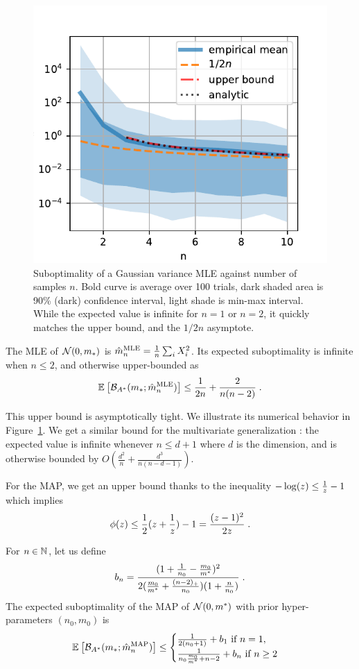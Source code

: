 \documentclass[twoside]{article}
\newcommand*{\expect}[2][]{\ensuremath{\mathbb{E}_{#1} \left[ #2 \right] }} %
\newcommand{\logpart}{A}
\newcommand{\bregmanconj}{\cB_{\logpart^*}}
\newcommand{\m}{m}
\begin{document}
\begin{figure}[ht]
	\centering
\includegraphics[width=.4\textwidth]{fewsamples.pdf}
	\caption{Suboptimality of a Gaussian variance MLE against number of samples $n$. Bold curve is average over 100 trials,  dark shaded area is 90\% (dark) confidence interval, light shade is min-max interval. 
		While the expected value is infinite for $n=1$ or $n=2$, it quickly matches the upper bound, and the $1/2n$ asymptote.
	}
	\label{fig:curves}
\end{figure}


\begin{theorem}
	The MLE of $\cN(0,\m_*)$ is $\hat \m_n^\text{MLE} = \inv{n} \sum_i X_i^2 $.
	Its expected suboptimality is infinite when $n\leq 2$, and otherwise upper-bounded as
	\begin{align}
		 \expect{\bregmanconj( \m_*; \hat \m_n^\text{MLE}) }
			\leq \inv{2n} +\frac{2}{n(n-2)} \; .
			\label{eq:MLE_rate}
	\end{align}
\end{theorem}

This upper bound is asymptotically tight.
We illustrate its numerical behavior in Figure~\ref{fig:curves}.
We get a similar bound for the multivariate generalization :
the expected value is infinite whenever $n \leq d+1$ where $d$ is the dimension, and is otherwise bounded by $O(\frac{d^2}{n} + \frac{d^3}{n(n-d-1)} )$.
  
For the MAP, we get an upper bound thanks to the inequality $ - \log(z) \leq \frac{1}{z} - 1$ which implies
\begin{align}
	\label{eq:log_bound} 
	\phi(z) \leq \frac{1}{2} (z + \frac{1}{z}) - 1 = \frac{(z-1)^2}{2 z} \; .
\end{align}

\begin{theorem}
 For $n\in \mathbb{N}$, let us  define
 \begin{align}
	b_n = \frac{(1 + \inv{n_0} - \frac{\m_0}{\m^*})^2}{2 (\frac{\m_0}{\m^*}+\frac{(n-2)_+}{n_0})(1 + \frac{n}{n_0} )} \; .
 \end{align}
The expected suboptimality of the MAP of $\cN(0,\m^*)$ with prior hyper-parameters $(n_0,\m_0)$ is
 \begin{equation}
	\expect{\bregmanconj( \m_*; \hat \m_n^\text{MAP})}
	\leq \begin{cases}
		\inv{2(n_0+1)}  +  b_1 \ \text{if}\ n=1,\\
		\frac{1}{n_0 \frac{\m_0}{\m^*} +n-2} + b_n \ \text{if}\ n\geq 2
	\end{cases}
	\label{eq:MAP_rate}
\end{equation}
\end{theorem}
\end{document}
